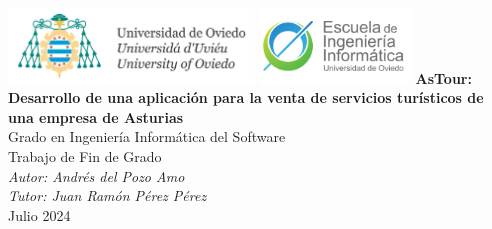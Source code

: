 \begin{titlepage} \centering
	\includegraphics[height=2cm]{0-Portada/logo_universidad.png}\hspace{2cm}
	\includegraphics[height=2cm]{0-Portada/logo_escuela.png}
	\vfill
	{\Large\bfseries AsTour:}\\[1ex]
	{\large\bfseries Desarrollo de una aplicación para la venta de servicios turísticos de una empresa de Asturias}\\[2ex]
	{\large Grado en Ingeniería Informática del Software}\\[1ex]
	{\large Trabajo de Fin de Grado}\\[1ex]
	\vfill
	{\large\itshape Autor: Andrés del Pozo Amo}\\[1ex]
	{\large\itshape Tutor: Juan Ramón Pérez Pérez}\\[2ex]
	{\large Julio 2024}
\end{titlepage}